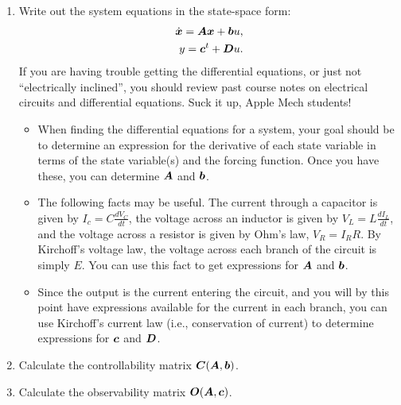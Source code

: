 \begin{enumerate}
    \item Write out the system equations in the state-space form:
          \begin{eqnarray*}
              \dot{\boldsymbol{x}}=\boldsymbol{A}\boldsymbol{x}+\boldsymbol{b}u,\\y=\boldsymbol{c}^{t}+\boldsymbol{D}u.
          \end{eqnarray*}
          If you are having trouble getting the differential equations, or just not
          ``electrically inclined'', you should review past course notes on electrical
          circuits and differential equations.  Suck it up, Apple Mech students!
          \begin{itemize}
              \item When finding the differential equations for a system, your goal should
                    be to determine an expression for the derivative of each state variable in
                    terms of the state variable(s) and the forcing function.  Once you have %
                    these, you can determine \(\boldsymbol{A}\) and \(\boldsymbol{b}\).

              \item The following facts may be useful.  The current through a capacitor is
                    given by \(I_{c}=C\frac{dV_{C}}{dt}\), the voltage across an inductor is
                    given by \(V_{L}=L\frac{dI_{L}}{dt}\), and the voltage across a resistor is
                    given by Ohm's law, \(V_{R}=I_{R}R\).  By Kirchoff's voltage law, the voltage
                    across each branch of the circuit is simply \(E\). You can use this fact to
                    get expressions for \(\boldsymbol{A}\) and \(\boldsymbol{b}\).

              \item Since the output is the current entering the circuit, and you will by
                    this point have expressions available for the current in each branch, you can
                    use Kirchoff's current law (i.e., conservation of current) to determine
                    expressions for \(\boldsymbol{c}\) and \(\boldsymbol{D}\).
          \end{itemize}

    \item Calculate the controllability matrix \(\boldsymbol{C}(\boldsymbol{A},\boldsymbol{b})\).

    \item Calculate the observability matrix \(\boldsymbol{O}(\boldsymbol{A},\boldsymbol{c})\).


\end{enumerate}
